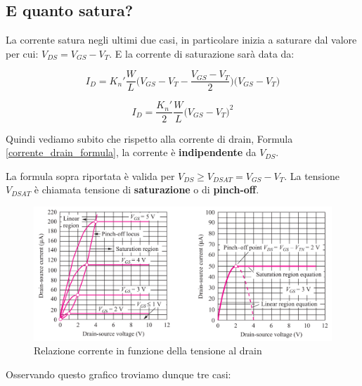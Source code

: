 \newpage
\subsection{E quanto satura?}
La corrente satura negli ultimi due casi, in particolare inizia a saturare dal valore per cui: $V_{DS} = V_{GS} - V_{T}$. E la corrente di saturazione sarà data da:

\begin{equation*}
    I_D = K_n'\frac{W}{L}\biggl(V_{GS} - V_T - \frac{V_{GS}-V_T}{2}\biggl)\big(V_{GS} - V_T\big)
\end{equation*}

\begin{equation}
    I_D = \frac{K_n'}{2}\frac{W}{L}\biggl(V_{GS} - V_T \biggl)^2
    \label{Equazione_corrente_pinch_off}
\end{equation}

Quindi vediamo subito che rispetto alla corrente di drain, Formula \ref{corrente_drain_formula}, la corrente è \textbf{indipendente} da $V_{DS}$.

La formula sopra riportata è valida per $V_{DS} \geq V_{DSAT} = V_{GS} - V_T$. La tensione $V_{DSAT}$ è chiamata tensione di \textbf{saturazione} o di \textbf{pinch-off}.

\begin{figure}[htbp]
    \centering
    \includegraphics[width=0.9\linewidth]{img/pinch_off.png}
    \caption{Relazione corrente in funzione della tensione al drain}    
\end{figure}

 Osservando questo grafico troviamo dunque tre casi:

